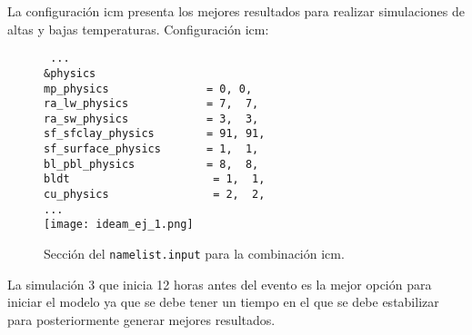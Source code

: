 La configuración icm presenta los mejores resultados para realizar simulaciones de altas y bajas temperaturas. Configuración icm:\\

\begin{figure}[H]
\centering
\texttt{
...\\
\&physics\\
mp\_physics~~~~~~~~~~~~~~~=~0,~0,\\
ra\_lw\_physics~~~~~~~~~~~~=~7,~~7,\\
ra\_sw\_physics~~~~~~~~~~~~=~3,~~3,\\
sf\_sfclay\_physics~~~~~~~~=~91,~91,\\
sf\_surface\_physics~~~~~~~=~1,~~1,\\
bl\_pbl\_physics~~~~~~~~~~~=~8,~~8,\\
bldt~~~~~~~~~~~~~~~~~~~~~~=~1,~~1,\\
cu\_physics~~~~~~~~~~~~~~~~=~2,~~2,\\
...\\
}
\centering
\texttt{[image: ideam\_ej\_1.png]}
\caption{Sección del \texttt{namelist.input} para la combinación icm.}
\label{imag_tab_ej3}
\end{figure}

La simulación 3 que inicia 12 horas antes del evento es la mejor opción para iniciar el modelo ya que se debe tener un tiempo en el que se debe estabilizar para posteriormente generar mejores resultados.

